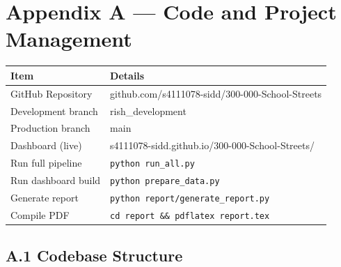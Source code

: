 \documentclass[11pt,a4paper]{article}
\begin{document}
\newpage
\appendix
\section*{Appendix A — Code and Project Management}

\begin{table}[H]\centering\small
\begin{tabular}{L{4cm}L{10cm}}
\toprule
\textbf{Item} & \textbf{Details} \\
\midrule
GitHub Repository    & github.com/s4111078-sidd/300-000-School-Streets \\
Development branch   & rish\_development \\
Production branch    & main \\
Dashboard (live)     & s4111078-sidd.github.io/300-000-School-Streets/ \\
Run full pipeline    & \texttt{python run\_all.py} \\
Run dashboard build  & \texttt{python prepare\_data.py} \\
Generate report      & \texttt{python report/generate\_report.py} \\
Compile PDF          & \texttt{cd report \&\& pdflatex report.tex} \\
\bottomrule
\end{tabular}
\end{table}

\subsection*{A.1 Codebase Structure}
\end{document}
